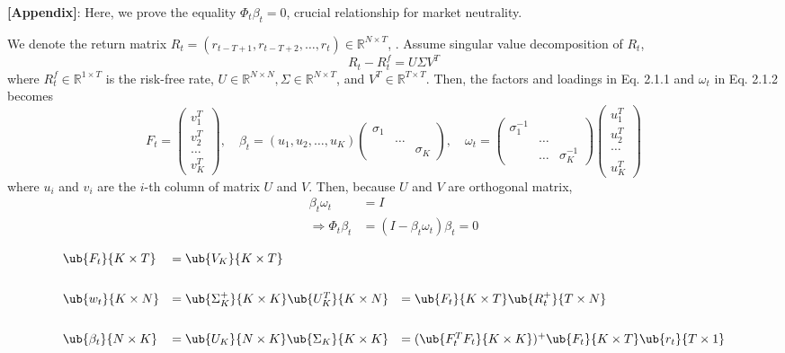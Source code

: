 \documentclass[12pt,article]{memoir}
\begin{document}
\textbf{[Appendix]}:
Here, we prove the equality $\Phi_t \beta_t=0$, crucial relationship for market neutrality. 

We denote the return matrix $R_t=\left(r_{t-T+1}, r_{t-T+2}, \ldots, r_t\right) \in \mathbb{R}^{N \times T}$, . Assume singular value decomposition of $R_t$,
$$
R_t-R_t^f=U \Sigma V^T
$$
where $R_t^f \in \mathbb{R}^{1 \times T}$ is the risk-free rate, $U \in \mathbb{R}^{N \times N}, \Sigma \in \mathbb{R}^{N \times T}$, and $V^T \in \mathbb{R}^{T \times T}$. Then, the factors and loadings in Eq. 2.1.1 and $\omega_t$ in Eq. 2.1.2 becomes
$$F_t=\left(\begin{array}{c}v_1^T \\ v_2^T \\ \ldots \\ v_K^T\end{array}\right), \quad \beta_t=\left(u_1, u_2, \ldots, u_K\right)\left(\begin{array}{ccc}\sigma_1 & & \\ & \ldots & \\ & & \sigma_K\end{array}\right), \quad \omega_t=\left(\begin{array}{ccc}\sigma_1^{-1} & & \\ & \ldots & \\ & \ldots & \sigma_K^{-1}\end{array}\right)\left(\begin{array}{c}u_1^T \\ u_2^T \\ \ldots \\ \\ u_K^T\end{array}\right)$$
where $u_i$ and $v_i$ are the $i$-th column of matrix $U$ and $V$. 
Then, because $U$ and $V$ are orthogonal matrix,
$$
\begin{aligned}
\beta_t \omega_t & =I \\
\Longrightarrow \Phi_t \beta_t & =\left(I-\beta_t \omega_t\right) \beta_t=0
\end{aligned}
$$

\Vhrulefill

$$\begin{array}{lllll}
\ub{F_t}{K \times T} 
&= \ub{V_K}{K \times T} 
\\[2em]
\ub{w_t}{K \times N} 
&= \ub{\Sigma_K^+}{K\times K} \ub{U_K^T}{K\times N}
&= \ub{F_t}{K\times T}\ub{R_t^+}{T\times N}
\\[2em]
\ub{\beta_t}{N\times K} &= \ub{U_K}{N\times K} \ub{\Sigma_K}{K\times K}
&= (\ub{F_t^T F_t}{K\times K})^+ \ub{F_t}{K\times T} \ub{r_t}{T\times 1}
\end{array}$$
\end{document}

